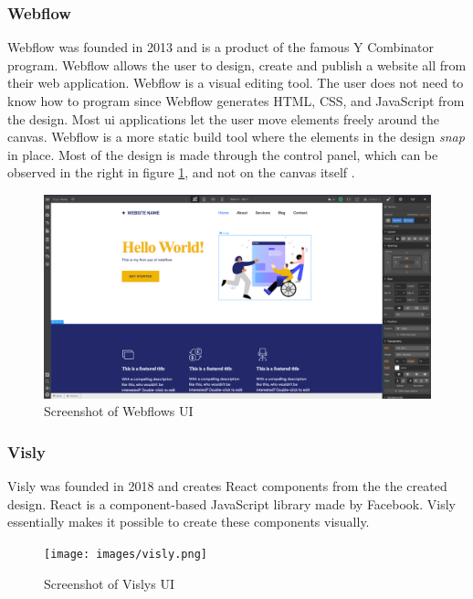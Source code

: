 \subsubsection{Webflow}
Webflow was founded in 2013 and is a product of the famous Y Combinator program\cite{Combinator}. Webflow allows the user to design, create and publish a website all from their web application. Webflow is a visual editing tool. The user does not need to know how to program since Webflow generates HTML, CSS, and JavaScript from the design. Most \acrshort{ui} applications let the user move elements freely around the canvas. Webflow is a more static build tool where the elements in the design \textit{snap} in place. Most of the design is made through the control panel, which can be observed in the right in figure \ref{fig:webflow}, and not on the canvas itself \cite{ResponsiveWebDesign}. 

\begin{figure}[H]
  \centering
  \includegraphics[width=0.8\linewidth]{images/webflow.png}
  \caption{Screenshot of Webflows UI}%
  \label{fig:webflow}
\end{figure}

\subsubsection{Visly}%
\label{ssub:Visly}
Visly was founded in 2018 and creates React \glspl{component} \cite{facebookincReactJavaScriptLibrary} from the the created design. React is a component-based JavaScript library made by Facebook. Visly essentially makes it possible to create these \glspl{component} visually. 

\begin{figure}[H]
  \centering
  \texttt{[image: images/visly.png]}
  \caption{ Screenshot of Vislys UI }%
  \label{fig:visly}
\end{figure}




